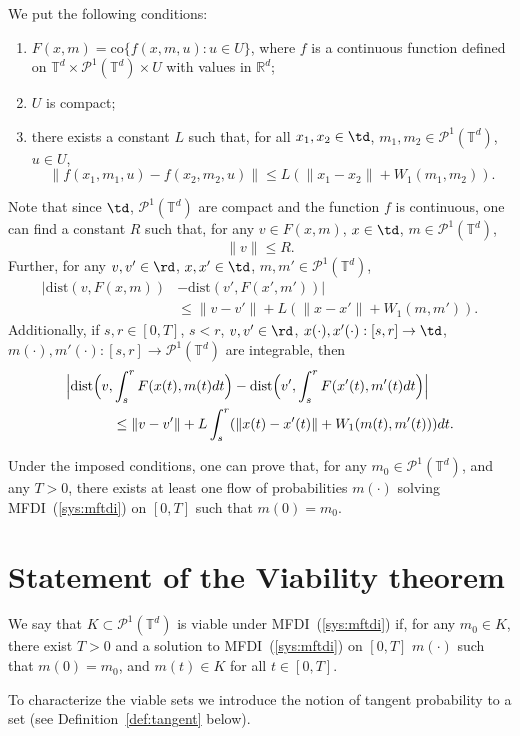 \documentclass[12pt]{article}
\newcommand{\ptd}{\mathcal{P}^1(\mathbb{T}^d)}
\newcommand{\tdxptd}{\mathbb{T}^d\times\mathcal{P}^1(\mathbb{T}^d)}
\begin{document}
We put the following conditions:
\begin{enumerate}
	\item $F(x,m)=\mathrm{co}\{f(x,m,u):u\in U\}$, where $f$ is a continuous function defined on $\tdxptd\times U$ with values in $\mathbb{R}^d$;
	\item $U$ is compact;
	\item there exists a constant $L$ such that, for all $x_1,x_2\in\td$, $m_1,m_2\in\ptd$, $u\in U$,
	$$\|f(x_1,m_1,u)-f(x_2,m_2,u)\|\leq L(\|x_1-x_2\|+W_1(m_1,m_2)). $$
\end{enumerate}
Note that since $\td$, $\ptd$ are compact and the function $f$ is continuous, one can find a constant $R$ such that, for any  $v\in F(x,m)$, $x\in\td$, $m\in\ptd$,
\begin{equation}\label{estima:F_bound}
\|v\|\leq R.
\end{equation} 
Further, for any $v,v'\in\rd$, $x,x'\in\td$, $m,m'\in \ptd$,
\begin{equation}\label{estima:F_Lipshitz}
\begin{split}
|\mathrm{dist}(v,F(x,m))&-\mathrm{dist}(v',F(x',m'))|\\&\leq \|v-v'\|+L(\|x-x'\|+W_1(m,m')).
\end{split}
\end{equation} Additionally, if $s,r\in [0,T]$, $s<r$, $v,v'\in \rd$, $x(\cdot),x'(\cdot):[s,r]\rightarrow\td$, $m(\cdot),m'(\cdot):[s,r]\rightarrow\ptd$ are integrable, then
\begin{equation}\label{estima:dist_F_int_Lipshitz}\begin{split}\Bigl|\mathrm{dist}\Bigl(v,&\int_s^rF(x(t),m(t)dt\Bigr)- \mathrm{dist}\Bigl(v',\int_s^rF(x'(t),m'(t)dt\Bigr)\Bigr|\\ &\leq \|v-v'\|+L\int_s^r(\|x(t)-x'(t)\|+W_1(m(t),m'(t)))dt.\end{split} \end{equation}

Under the imposed conditions, one can prove that, for any $m_0\in\ptd$, and any $T>0$, there exists at least one flow of probabilities  $m(\cdot)$ solving MFDI~(\ref{sys:mftdi}) on $[0,T]$ such that $m(0)=m_0$.



\section{Statement of the Viability theorem}\label{sec:statement}

\begin{definition}\label{def:viable}
	We say that $K\subset \ptd$ is viable under MFDI~(\ref{sys:mftdi})  if, for any $m_0\in K$, there exist $T>0$ and a solution to MFDI~(\ref{sys:mftdi}) on $[0,T]$ $m(\cdot)$ such that $m(0)=m_0$, and $m(t)\in K$ for all $t\in[0,T]$.
\end{definition}
To characterize the viable sets we introduce the notion of tangent probability to a set (see Definition~\ref{def:tangent} below).
\end{document}

